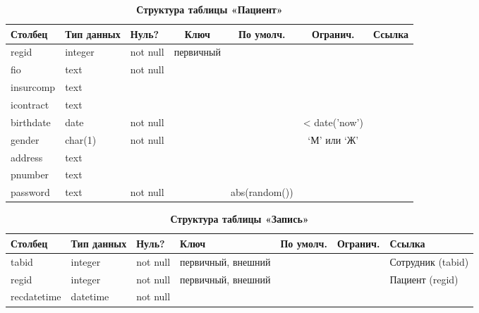 \documentclass[14pt,a4paper,russian]{extreport}
\begin{document}
\begin{table}[h!]
    \caption{ } 
    \begin{subtable}[t]{\textwidth}
        \caption{\textbf{Структура таблицы «Пациент»}}
    \begin{tabularx}{\textwidth}{| X | X | X | c | c | c | X |}
        \hline
        \textbf{Столбец} & \textbf{Тип данных} & \textbf{Нуль?} & \textbf{Ключ} & \textbf{По
        умолч.} & \textbf{Огранич.} & \textbf{Ссылка} \\ \hline
        regid & integer & not null & первичный & & & \\ \hline
        fio & text & not null & & & & \\ \hline
	insurcomp & text & & & & & \\ \hline
	icontract & text  & & & & & \\ \hline
        birthdate & date & not null & & & < date('now') & \\ \hline
        gender & char(1) & not null & & & `М' или `Ж' & \\ \hline
        address & text & & & & & \\ \hline
        pnumber & text & & & & & \\ \hline
        password & text & not null & & abs(random()) & & \\ \hline
    \end{tabularx}
    \end{subtable}
    \label{table:pat}
\end{table}

\begin{table}[h!]
    \caption{ } 
    \begin{subtable}[t]{\textwidth}
        \caption{\textbf{Структура таблицы «Запись»}}
    \begin{tabularx}{\textwidth}{| X | X | X | X | X | X | X |}
        \hline
        \textbf{Столбец} & \textbf{Тип данных} & \textbf{Нуль?} & \textbf{Ключ} & \textbf{По
        умолч.} & \textbf{Огранич.} & \textbf{Ссылка} \\ \hline
        tabid & integer & not null & первичный, внешний & & & Сотрудник (tabid) \\ \hline
        regid & integer & not null & первичный, внешний & & & Пациент (regid)  \\ \hline
        recdatetime & datetime & not null & & & & \\ \hline
    \end{tabularx}
    \end{subtable}
    \label{table:rec}
\end{table}
\end{document}
